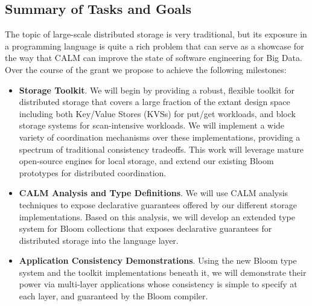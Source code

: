 \subsection{Summary of Tasks and Goals}
The topic of large-scale distributed storage is very traditional, but its exposure in a programming language is quite a rich problem that can serve as a showcase for the way that CALM can improve the state of software engineering for Big Data.  Over the course of the grant we propose to achieve the following milestones:
\begin{itemize}
\item \textbf{Storage Toolkit}.  We will begin by providing a robust, flexible toolkit for distributed storage that covers a large fraction of the extant design space including both Key/Value Stores (KVSs) for put/get workloads, and block storage systems for scan-intensive workloads.  We will implement a wide variety of coordination mechanisms over these implementations, providing a spectrum of traditional consistency tradeoffs. This work will leverage mature open-source engines for local storage, and extend our existing Bloom prototypes for distributed coordination.
\item \textbf{CALM Analysis and Type Definitions}.  We will use CALM analysis techniques to expose declarative guarantees offered by our different storage implementations.  Based on this analysis, we will develop an extended type system for Bloom collections that exposes declarative guarantees for distributed storage into the language layer.  
\item \textbf{Application Consistency Demonstrations}.  Using the new Bloom type system and the toolkit implementations beneath it, we will demonstrate their power via multi-layer applications whose consistency is simple to specify at each layer, and guaranteed by the Bloom compiler.
\end{itemize}